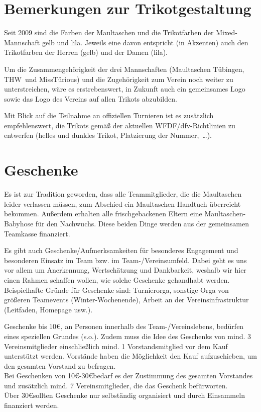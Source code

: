 \documentclass[a4 paper, 11pt]{article}
\begin{document}
\section{Bemerkungen zur Trikotgestaltung}
Seit 2009 sind die Farben der Maultaschen und die Trikotfarben der Mixed-Mannschaft gelb und lila. Jeweils eine davon entspricht (in Akzenten) auch den Trikotfarben der Herren (gelb) und der Damen (lila).
 
Um die Zusammengehörigkeit der drei Mannschaften (\glqq Maultaschen Tübingen\grqq, \glqq THW\grqq\ und \glqq MissTürious\grqq) und die Zugehörigkeit zum Verein noch weiter zu unterstreichen, wäre es erstrebenswert, in Zukunft auch ein gemeinsames Logo sowie das Logo des Vereins auf allen Trikots abzubilden.

Mit Blick auf die Teilnahme an offiziellen Turnieren ist es zusätzlich empfehlenswert, die Trikots gemäß der aktuellen WFDF/dfv-Richtlinien zu entwerfen (helles und dunkles Trikot, Platzierung der Nummer,~\dots).


\section{Geschenke}
Es ist zur Tradition geworden, dass alle Teammitglieder, die die Maultaschen leider verlassen müssen, zum Abschied ein Maultaschen-Handtuch überreicht bekommen. Außerdem erhalten alle frischgebackenen Eltern eine Maultaschen-Babyhose für den Nachwuchs. Diese beiden Dinge werden aus der gemeinsamen Teamkasse finanziert. 


Es gibt auch Geschenke/Aufmerksamkeiten für besonderes Engagement und besonderen Einsatz im Team bzw. im Team-/Vereinsumfeld. Dabei geht es uns vor allem um Anerkennung, Wertschätzung und Dankbarkeit, weshalb wir hier einen Rahmen schaffen wollen, wie solche Geschenke gehandhabt werden. Beispielhafte Gründe für Geschenke sind: Turnierorga, sonstige Orga von größeren Teamevents (Winter-Wochenende), Arbeit an der Vereinsinfrastruktur (Leitfaden, Homepage usw.). 

Geschenke bis 10\euro, an Personen innerhalb des Team-/Vereinslebens, bedürfen eines speziellen Grundes (s.o.). Zudem muss die Idee des Geschenks von mind. 3 Vereinsmitglieder einschließlich mind. 1 Vorstandsmitglied vor dem Kauf unterstützt werden. Vorstände haben die Möglichkeit den Kauf aufzuschieben, um den gesamten Vorstand zu befragen. \\
Bei Geschenken von 10\euro-30\euro bedarf es der Zustimmung des gesamten Vorstandes und zusätzlich mind. 7 Vereinsmitglieder, die das Geschenk befürworten.\\ 
Über 30\euro sollten Geschenke nur selbständig organisiert und durch Einsammeln finanziert werden. 
\end{document}
